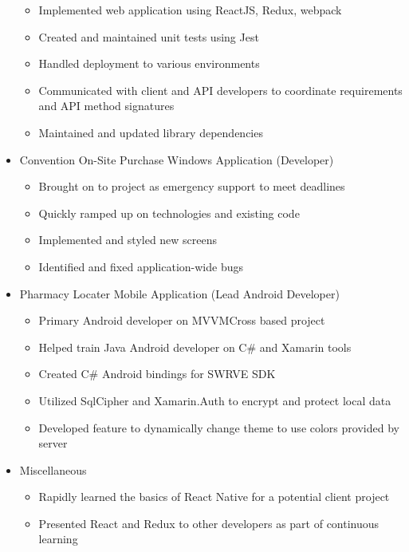 \documentclass[12pt,letterpaper,sans]{moderncv}
\begin{document}
\begin{itemize}[leftmargin=1.24in]
\begin{itemize}
	    		\item Implemented web application using ReactJS, Redux, webpack
	    		\item Created and maintained unit tests using Jest
	    		\item Handled deployment to various environments
	    		\item Communicated with client and API developers to coordinate requirements and API method signatures
	    		\item Maintained and updated library dependencies 
	    	\end{itemize} 
    	\item Convention On-Site Purchase Windows Application (Developer)
		    \begin{itemize}
			    \item Brought on to project as emergency support to meet deadlines
			    \item Quickly ramped up on technologies and existing code
			    \item Implemented and styled new screens
			    \item Identified and fixed application-wide bugs
			\end{itemize} 
    	\item Pharmacy Locater Mobile Application (Lead Android Developer)
	    	\begin{itemize}
		    	\item Primary Android developer on MVVMCross based project
		    	\item Helped train Java Android developer on C\# and Xamarin tools
		    	\item Created C\# Android bindings for SWRVE SDK
		    	\item Utilized SqlCipher and Xamarin.Auth to encrypt and protect local data
		    	\item Developed feature to dynamically change theme to use colors provided by server
		    \end{itemize} 
	   	\item Miscellaneous
	   		\begin{itemize}
	   			\item Rapidly learned the basics of React Native for a potential client project
	   			\item Presented React and Redux to other developers as part of continuous learning
	   		\end{itemize}
    \end{itemize} 
\end{document}
